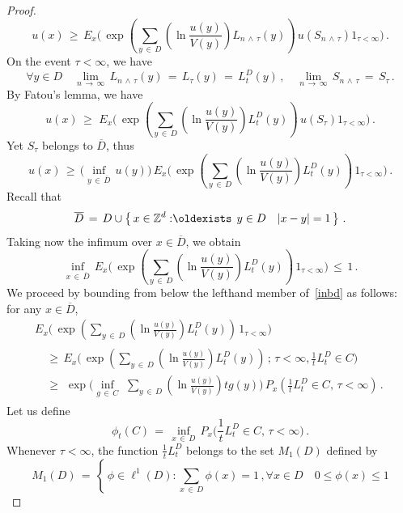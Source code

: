 \documentclass[10pt]{amsart}
\theoremstyle{definition}\newtheorem{defi}[theo]{Definition}\newtheorem{rema}[theo]{Remark}\newtheorem{exam}[theo]{Example}\newtheorem{exem}[theo]{Example}\newtheorem{nota}[theo]{Notation}
\newcommand*\bD{\overline{D}}
\newcommand*\Zd {{\mathbb Z^d}}
\renewcommand*{\exists}{\mathrel{\oldexists}}
\let\oldforall\forall
\renewcommand*{\forall}{\mathrel{\oldforall}}
\begin{document}
\begin{proof}
\[
u(x)\,\geq\,
E_x\Bigg(
\,\exp\left(\sum_{y\,\in\,D}\left(\ln
\frac{u(y)}{V(y)}\right)L_{n\,\wedge\,\tau}(y)\right)\, u(S_{n\,\wedge\,\tau}) 1_{\tau<\infty}
\Bigg)
\,.
\]
On the event $\tau<\infty$, we have
\[
\forall y\in D\quad
\lim_{n\,\to\,\infty}\, L_{n\,\wedge\,\tau}(y)\,=\, L_{\tau}(y)\,=\, L_t^D(y)\,,
\quad\lim_{n\,\to\,\infty}\, S_{n\,\wedge\,\tau}\,=\, S_{\tau}
\,.
\]
By Fatou's lemma, we have
\begin{equation*}
u(x)
\,\geq\,
\,E_x\Bigg(
\,\exp\left(\sum_{y\,\in\,D}\left(\ln
\frac{u(y)}{V(y)}\right)L_{t}^D(y)\right)\, u(S_\tau) 1_{\tau<\infty}
\Bigg)\,.
\end{equation*}
Yet $S_\tau$ belongs to $\bD$, thus
\begin{equation}
u(x)
\,\geq\,
\Big(\inf_{y\,\in\,\bD}\,u(y)\Big)
\,E_x\Bigg(
\,\exp\left(\sum_{y\,\in\,D}\left(\ln
\frac{u(y)}{V(y)}\right)L_{t}^D(y)\right)\, 1_{\tau<\infty}
\Bigg)\,.
\end{equation}
Recall that
\[
\bD\,=\,D\cup\left\{\,x\in\Zd:\exists\, y\in D\quad |x-y|=1\,\right\}\,.
\]
Taking now the infimum over $x\in \bD$, we obtain
\begin{equation}\label{inbd}
\inf_{x\,\in\,\bD}
\,E_x\Bigg(
\,\exp\left(\sum_{y\,\in\,D}\left(\ln
\frac{u(y)}{V(y)}\right)L_{t}^D(y)\right)\, 1_{\tau<\infty}
\Bigg)\,\leq\,1\,.
\end{equation}
We proceed by bounding from below the lefthand member of~\eqref{inbd} as follows: for any $x\in \bD$,
\begin{multline}\label{foui}
\,E_x\Bigg(
\,\exp\left(\sum_{y\,\in\,D}\left(\ln
\frac{u(y)}{V(y)}\right)L_{t}^D(y)\right)\, 1_{\tau<\infty}
\Bigg)\,\\
\begin{aligned}
&\geq\,E_x\Bigg(
\,\exp\left(\sum_{y\,\in\,D}\left(\ln
\frac{u(y)}{V(y)}\right)L_{t}^D(y)\right)\,;
\,\tau<\infty,\frac{1}{t}L_t^D\in C
\Bigg)\\
&\geq\,
\,\exp\Bigg(
\inf_{g\,\in\,C}\,\,\sum_{y\,\in\,D}\left(\ln
\frac{u(y)}{V(y)}\right){t}g(y)\Bigg)\, P_x\left(\frac{1}{t}L_t^D\in C,\,\tau<\infty\right)\,.
\end{aligned}
\end{multline}
Let us define
\begin{equation}\label{phitc}
\phi_t(C)\,=\,
\inf_{x\,\in\,D}\, P_x\bigg(\frac{1}{t}L_t^D\in C,\,\tau<\infty\bigg)\,.
\end{equation}
Whenever $\tau<\infty$, the function $\frac{1}{t}L_t^D$ belongs to the set $M_1(D)$ defined by
\[
M_1(D)\,=\,\left\{\,\phi
\in\ell^1(D):\sum_{x\,\in\,D}\phi(x)=1\,,\forall x\in D\quad 0\leq\phi(x)\leq 1
\]
\end{proof}
\end{document}
